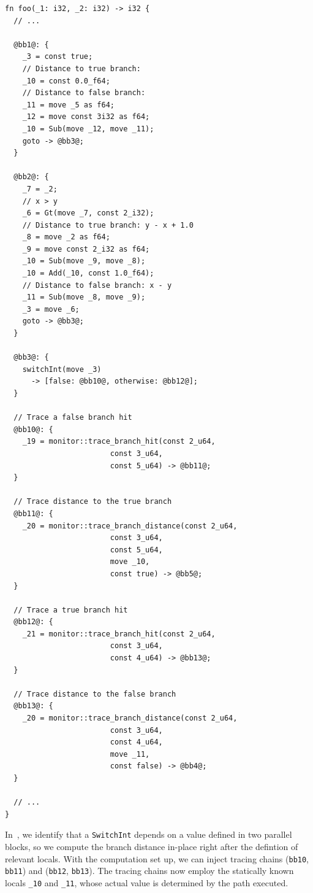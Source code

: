 \documentclass[paper=a4,%
  twoside,%
  BCOR4mm,%
  abstract=true,%
  toc=bibliography,%
  chapterprefix=true,%
  toc=bibliographynumbered,%
  open=right,%
  english,%
  pagesize=pdftex]{scrreprt}
\newcommand{\mir}{\ac{MIR}\xspace}
\begin{document}
\begin{lstlisting}[language={MIR}, style=boxed, caption={Computing branch distances in-place within the \mir}, label=lst:compound-conditional-mir-in-place-distance, escapechar=§]
fn foo(_1: i32, _2: i32) -> i32 {
  // ...

  @bb1@: {
    _3 = const true;
    // Distance to true branch:
    _10 = const 0.0_f64;
    // Distance to false branch:
    _11 = move _5 as f64;
    _12 = move const 3i32 as f64;
    _10 = Sub(move _12, move _11);
    goto -> @bb3@;
  }

  @bb2@: {
    _7 = _2;
    // x > y
    _6 = Gt(move _7, const 2_i32);
    // Distance to true branch: y - x + 1.0
    _8 = move _2 as f64;
    _9 = move const 2_i32 as f64;
    _10 = Sub(move _9, move _8);
    _10 = Add(_10, const 1.0_f64);
    // Distance to false branch: x - y
    _11 = Sub(move _8, move _9);
    _3 = move _6;
    goto -> @bb3@;
  }

  @bb3@: {
    switchInt(move _3)
      -> [false: @bb10@, otherwise: @bb12@];
  }

  // Trace a false branch hit
  @bb10@: {
    _19 = monitor::trace_branch_hit(const 2_u64,
                        const 3_u64,
                        const 5_u64) -> @bb11@;
  }

  // Trace distance to the true branch
  @bb11@: {
    _20 = monitor::trace_branch_distance(const 2_u64,
                        const 3_u64,
                        const 5_u64,
                        move _10,
                        const true) -> @bb5@;
  }

  // Trace a true branch hit
  @bb12@: {
    _21 = monitor::trace_branch_hit(const 2_u64,
                        const 3_u64,
                        const 4_u64) -> @bb13@;
  }

  // Trace distance to the false branch
  @bb13@: {
    _20 = monitor::trace_branch_distance(const 2_u64,
                        const 3_u64,
                        const 4_u64,
                        move _11,
                        const false) -> @bb4@;
  }

  // ...
}
\end{lstlisting}

In~, we identify that a \texttt{SwitchInt} depends on a value defined in two parallel blocks, so we compute the branch distance in-place right after the defintion of relevant locals. With the computation set up, we can inject tracing chains (\texttt{bb10}, \texttt{bb11}) and (\texttt{bb12}, \texttt{bb13}). The tracing chains now employ the statically known locals \texttt{\_10} and \texttt{\_11}, whose actual value is determined by the path executed.
\end{document}
